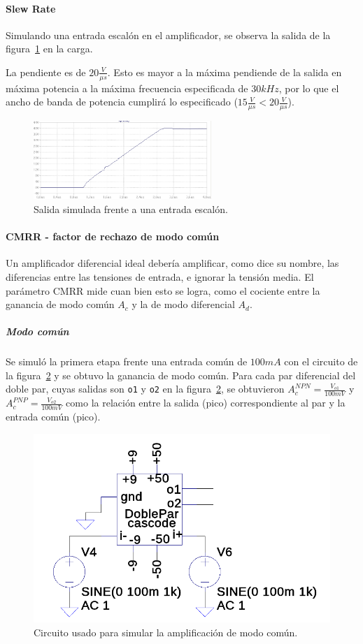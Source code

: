 \documentclass[a4paper,12pt,twoside]{article}
\begin{document}
\paragraph{Slew Rate} Simulando una entrada escalón en el amplificador, se observa la salida de la figura~\ref{fig:slew} en la carga.

La pendiente es de $20 \frac{V}{\mu s}$. Esto es mayor a la máxima pendiende de la salida en máxima potencia a la máxima frecuencia especificada de $30kHz$, por lo que el ancho de banda de potencia cumplirá lo especificado ($15 \frac{V}{\mu s}<20 \frac{V}{\mu s}$).


\begin{figure}[H]
	\centering
	\includegraphics[width=0.6\textwidth]{img/sim/slew}
	\caption{Salida simulada frente a una entrada escalón.}
	\label{fig:slew}
\end{figure}

\paragraph{CMRR - factor de rechazo de modo común}

Un amplificador diferencial ideal debería amplificar, como dice su nombre, las diferencias entre las tensiones de entrada, e ignorar la tensión media. El parámetro CMRR mide cuan bien esto se logra, como el cociente entre la ganancia de modo común $A_c$ y la de modo diferencial $A_d$. 

\subparagraph{Modo común} Se simuló la primera etapa frente una entrada común de $100mA$ con el circuito de la figura~\ref{fig:ac} y se obtuvo la ganancia de modo común. Para cada par diferencial del doble par, cuyas salidas son \texttt{o1} y \texttt{o2} en la figura~\ref{fig:ac}, se obtuvieron $A_c^{NPN}=\frac{V_{o1}}{100mV}$ y $A_c^{PNP}=\frac{V_{o2}}{100mV}$ como la relación entre la salida (pico) correspondiente al par y la entrada común (pico). 


\begin{figure}[H]
	\centering
	\includegraphics[height=0.2\textwidth]{img/sim/ac}
	\caption{Circuito usado para simular la amplificación de modo común.}
	\label{fig:ac}
\end{figure}
\end{document}
